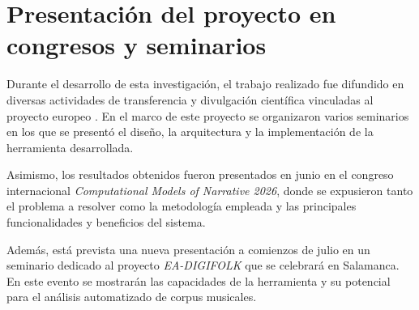 \chapter{Presentación del proyecto en congresos y seminarios}
\label{Appendix:Key1}

Durante el desarrollo de esta investigación, el trabajo realizado fue difundido en diversas actividades de transferencia y divulgación científica vinculadas al proyecto europeo . En el marco de este proyecto se organizaron varios seminarios en los que se presentó el diseño, la arquitectura y la implementación de la herramienta desarrollada.

Asimismo, los resultados obtenidos fueron presentados en junio en el congreso internacional \textit{Computational Models of Narrative 2026}, donde se expusieron tanto el problema a resolver como la metodología empleada y las principales funcionalidades y beneficios del sistema.

Además, está prevista una nueva presentación a comienzos de julio en un seminario dedicado al proyecto \textit{EA-DIGIFOLK} que se celebrará en Salamanca. En este evento se mostrarán las capacidades de la herramienta y su potencial para el análisis automatizado de corpus musicales.